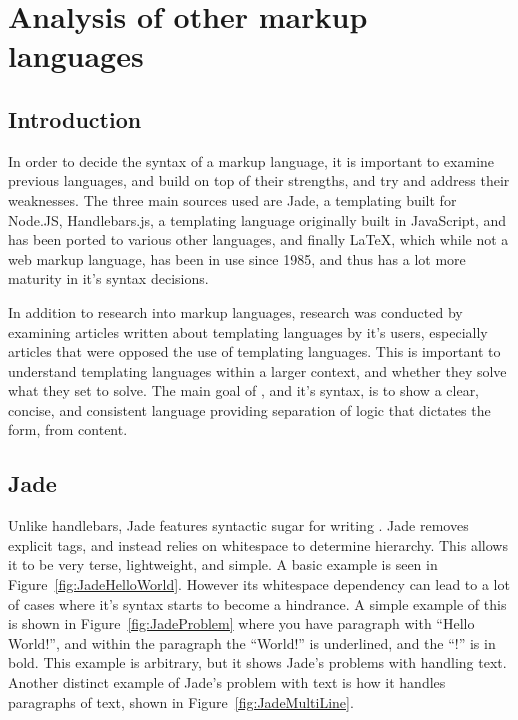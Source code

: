 \section{Analysis of other markup languages}

\subsection{Introduction}

In order to decide the syntax of a  markup language, it is important to examine previous languages, and build on top of their strengths, and try and address their weaknesses. The three main sources used are Jade, a templating built for Node.JS\cite{Jade}, Handlebars.js, a templating language originally built in JavaScript, and has been ported to various other languages, and finally \LaTeX{}, which while not a web markup language, has been in use since 1985\cite{LaTeX}, and thus has a lot more maturity in it's syntax decisions.

In addition to research into markup languages, research was conducted by  examining articles written about templating languages by it's users, especially articles that were opposed the use of templating languages. This is important to understand templating languages within a larger context, and whether they solve what they set to solve\cite{AgainstTemplating}\cite{LinkedinTemplating}. The main goal of \languageName{}, and it's syntax, is to show a clear, concise, and consistent language providing separation of logic that dictates the form, from content.

\subsection{Jade}

Unlike handlebars, Jade features syntactic sugar for writing . Jade removes explicit tags, and instead relies on whitespace to determine hierarchy. This allows it to be very terse, lightweight, and simple. A basic example is seen in Figure~\ref{fig:JadeHelloWorld}. However its whitespace dependency can lead to a lot of cases where it's syntax starts to become a hindrance. A simple example of this is shown in Figure~\ref{fig:JadeProblem} where you have paragraph with ``Hello World!'', and within the paragraph the ``World!'' is underlined, and the ``!'' is in bold. This example is arbitrary, but it shows Jade's problems with handling text. Another distinct example of Jade's problem with text is how it handles paragraphs of text, shown in Figure~\ref{fig:JadeMultiLine}. 

